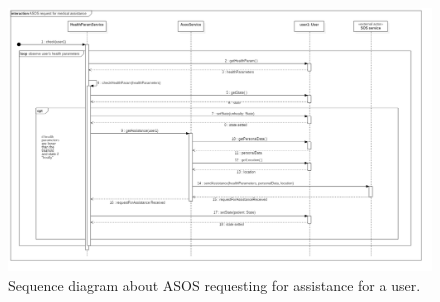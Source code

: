 \begin{figure}[h!]
	\includegraphics[width=1.0\textwidth]{./pictures/sequence_useAsos.png}\par
	\caption{Sequence diagram about ASOS requesting for assistance for a user.}
\end{figure}
\FloatBarrier 
